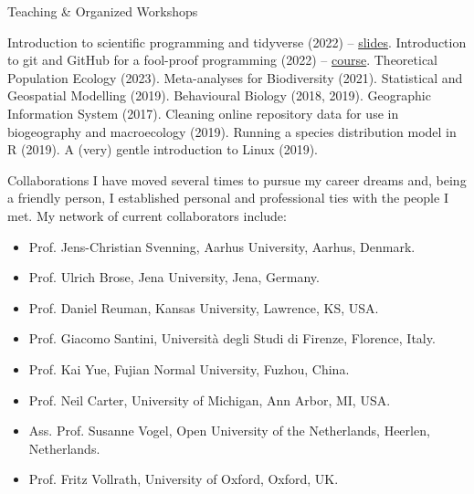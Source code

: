 \documentclass{resume} %
\newcommand{\spazio}{\begin{center} \par\noindent\rule{0.2\textwidth}{0.4pt} \end{center}}
\begin{document}
\begin{rSection}{Teaching \& Organized Workshops}


Introduction to scientific programming and tidyverse (2022) -- \href{https://emilio-berti.github.io/teaching/tidyverse.html#(1)}{slides}. Introduction to git and GitHub for a fool-proof programming (2022) -- \href{https://emilio-berti.github.io/idiv-git-introduction/}{course}. Theoretical Population Ecology (2023). Meta-analyses for Biodiversity (2021). Statistical and Geospatial Modelling (2019). Behavioural Biology (2018, 2019). Geographic Information System (2017). Cleaning online repository data for use in biogeography and macroecology (2019). Running a species distribution model in R (2019). A (very) gentle introduction to Linux (2019).
\end{rSection}

\begin{rSection}{Collaborations}
I have moved several times to pursue my career dreams and, being a friendly person, I established personal and professional ties with the people I met.
My network of current collaborators include:
\begin{itemize}
\setlength\itemsep{-0.5em}
    \item Prof. Jens-Christian Svenning, Aarhus University, Aarhus, Denmark.
    \item Prof. Ulrich Brose, Jena University, Jena, Germany.
    \item Prof. Daniel Reuman, Kansas University, Lawrence, KS, USA.
    \item Prof. Giacomo Santini, Universit\`{a} degli Studi di Firenze, Florence, Italy.
    \item Prof. Kai Yue, Fujian Normal University, Fuzhou, China.
    \item Prof. Neil Carter, University of Michigan, Ann Arbor, MI, USA.
    \item Ass. Prof. Susanne Vogel, Open University of the Netherlands, Heerlen, Netherlands.
    \item Prof. Fritz Vollrath, University of Oxford, Oxford, UK.
\end{itemize}
\end{rSection}
\end{document}
